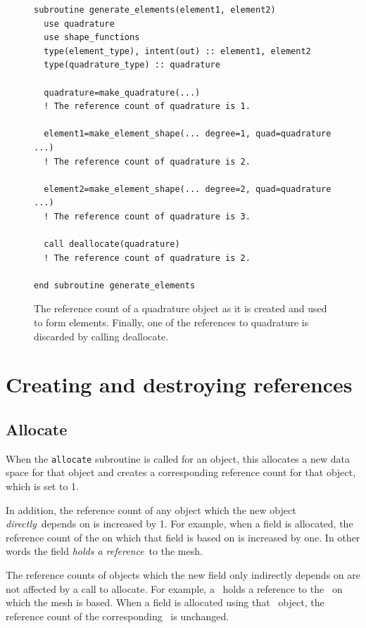 \documentclass[a4paper, 11pt]{book}
\begin{document}
\begin{figure}[ht]
  \begin{lstlisting}
subroutine generate_elements(element1, element2) 
  use quadrature 
  use shape_functions 
  type(element_type), intent(out) :: element1, element2
  type(quadrature_type) :: quadrature

  quadrature=make_quadrature(...)  
  ! The reference count of quadrature is 1.

  element1=make_element_shape(... degree=1, quad=quadrature ...)  
  ! The reference count of quadrature is 2.

  element2=make_element_shape(... degree=2, quad=quadrature ...)  
  ! The reference count of quadrature is 3.

  call deallocate(quadrature) 
  ! The reference count of quadrature is 2.

end subroutine generate_elements
  \end{lstlisting}
  \caption{The reference count of a quadrature object as it is created and used
  to form elements. Finally, one of the references to quadrature is
  discarded by calling deallocate.}
\label{fig:refcount}
\end{figure}

\section{Creating and destroying references}

\subsection{Allocate}

When the \lstinline+allocate+ subroutine is called for an object, this
allocates a new data space for that object and creates a corresponding
reference count for that object, which is set to 1. 

In addition, the reference count of any object which the new object
\emph{directly}\ depends on is increased by 1. For example, when a field is
allocated, the reference count of the \meshtype on which that field is based
on is increased by one. In other words the field \emph{holds a reference}\
to the mesh.

The reference counts of objects which the new field only indirectly depends
on are not affected by a call to allocate. For example, a \meshtype\ holds a
reference to the \elementtype\ on which the mesh is based. When a field is
allocated using that \meshtype\ object, the reference count of the
corresponding \elementtype\ is unchanged. 
\end{document}
